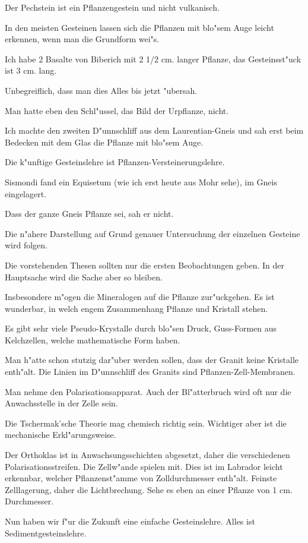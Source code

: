 \documentclass[a4paper, 11pt, oneside, german]{article}
\begin{document}
Der Pechstein ist ein Pflanzengestein und nicht vulkanisch.

In den meisten Gesteinen lassen sich die Pflanzen mit blo"sem Auge leicht erkennen, wenn man die Grundform wei"s.

Ich habe 2 Basalte von Biberich mit 2 1/2 cm. langer Pflanze, das Gesteinsst"uck ist 3 cm. lang.

Unbegreiflich, dass man dies Alles bis jetzt "ubersah.

Man hatte eben den Schl"ussel, das Bild der Urpflanze, nicht.

Ich machte den zweiten D"unnschliff aus dem Laurentian-Gneis und sah erst beim Bedecken mit dem Glas die Pflanze mit blo"sem Auge.

Die k"unftige Gesteinslehre ist Pflanzen-Versteinerungslehre.

Sismondi fand ein Equisetum (wie ich erst heute aus Mohr sehe), im Gneis eingelagert.

Dass der ganze Gneis Pflanze sei, sah er nicht.

Die n"ahere Darstellung auf Grund genauer Untersuchung der einzelnen Gesteine wird folgen.

Die vorstehenden Thesen sollten nur die ersten Beobachtungen geben. In der Hauptsache wird die Sache aber so bleiben.

Insbesondere m"ogen die Mineralogen auf die Pflanze zur"uckgehen. Es ist wunderbar, in welch engem Zusammenhang Pflanze und Kristall stehen.

Es gibt sehr viele Pseudo-Krystalle durch blo"sen Druck, Guss-Formen aus Kelchzellen, welche mathematische Form haben.

Man h"atte schon stutzig dar"uber werden sollen, dass der Granit keine Kristalle enth"alt. Die Linien im D"unnschliff des Granits sind Pflanzen-Zell-Membranen.

Man nehme den Polarisationsapparat. Auch der Bl"atterbruch wird oft nur die Anwachsstelle in der Zelle sein.

Die Tschermak'sche Theorie mag chemisch richtig sein. Wichtiger aber ist die mechanische Erkl"arungsweise.

Der Orthoklas ist in Anwachsungsschichten abgesetzt, daher die verschiedenen Polarisationsstreifen. Die Zellw"ande spielen mit. Dies ist im Labrador leicht erkennbar, welcher Pflanzenst"amme von Zolldurchmesser enth"alt. Feinste Zelllagerung, daher die Lichtbrechung. Sehe es eben an einer Pflanze von 1 cm. Durchmesser.

Nun haben wir f"ur die Zukunft eine einfache Gesteinslehre. Alles ist Sedimentgesteinslehre.
\end{document}
